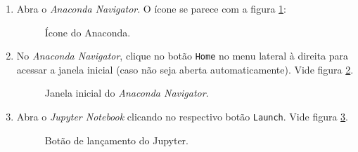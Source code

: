 \documentclass[a4paper,12pt]{article}
\begin{document}
\begin{enumerate}
\item
  Abra o \emph{Anaconda Navigator}. O ícone se parece com a figura \ref{fig:icon}:
\begin{figure}[h!]
\centering
\caption{\label{fig:icon}Ícone do Anaconda.}
\end{figure}  
\item
  No \emph{Anaconda Navigator}, clique no botão \texttt{Home} no menu
  lateral à direita para acessar a janela inicial (caso não seja aberta
  automaticamente). Vide figura \ref{fig:home}.
\begin{figure}[h!]
\centering
\caption{\label{fig:home}Janela inicial do \emph{Anaconda Navigator}.}
\end{figure}  
\item
  Abra o \emph{Jupyter Notebook} clicando no respectivo botão
  \texttt{Launch}. Vide figura \ref{fig:launch}.
  \begin{figure}[h!]
\centering
\caption{\label{fig:launch}Botão de lançamento do Jupyter.}

\end{figure}
\end{enumerate}
\end{document}
